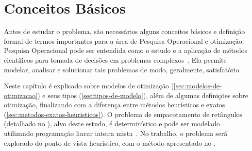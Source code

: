 \chapter{Conceitos Básicos}\label{ch:conceitos-basicos}


Antes de estudar o problema, são necessários alguns conceitos básicos e definição formal de termos
importantes para a área de Pesquisa Operacional e otimização.
Pesquisa Operacional pode ser entendida como o estudo e a aplicação de métodos científicos para
tomada de decisões em problemas complexos~\cite[p.IX]{arenales}.
Ela permite modelar, analisar e solucionar tais problemas de modo, geralmente, satisfatório.

Neste capítulo é explicado sobre modelos de otimização (\autoref{sec:modelos-de-otimizacao})
e seus tipos (\autoref{sec:tipos-de-modelo}), além de algumas definições sobre otimização,
finalizando com a diferença entre métodos heurísticos e exatos
(\cref{sec:metodos-exatos-heuristicos}).
O problema de empacotamento de retângulos (detalhado no ),
alvo deste estudo, é determinístico e pode ser modelado utilizando programação linear inteira
mista~\cite{wolsey2020integer}.
No trabalho, o problema será explorado do ponto de vista heurístico, com o método apresentado no
.




